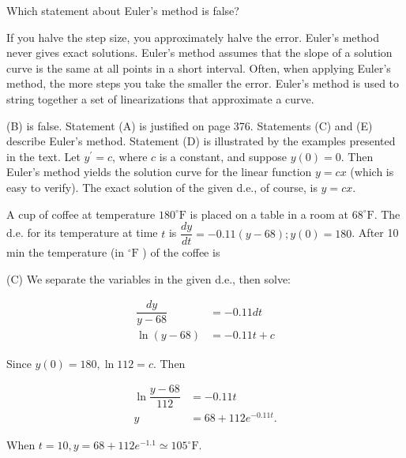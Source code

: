 \question
Which statement about Euler's method is false?
\begin{choices}
  \choice If you halve the step size, you approximately halve the error.
  \CorrectChoice Euler's method never gives exact solutions.
  \choice Euler's method assumes that the slope of a solution curve is the same at all points in a short interval.
  \choice Often, when applying Euler's method, the more steps you take the smaller the error.
  \choice Euler's method is used to string together a set of linearizations that approximate a curve.
\end{choices}
\begin{solution}
(B) is false. Statement (A) is justified on page 376. Statements (C) and (E) describe Euler's method. Statement (D) is illustrated by the examples presented in the text. Let $y^{\prime}=c$, where $c$ is a constant, and suppose $y(0)=0$. Then Euler's method yields the solution curve for the linear function $y=c x$ (which is easy to verify). The exact solution of the given d.e., of course, is $y=c x$.
\end{solution}




\newpage



\question\label{calc09:coffee}
A cup of coffee at temperature $180^{\circ} \mathrm{F}$ is placed on a table in a room at $68^{\circ} \mathrm{F}$. The d.e. for its temperature at time $t$ is $\dfrac{d y}{d t}=-0.11(y-68) ; y(0)=180$. After 10 min the temperature (in ${ }^{\circ} \mathrm{F}$ ) of the coffee is
\begin{choices}
\end{choices}
\begin{solution}
(C) We separate the variables in the given d.e., then solve:

\[
\begin{aligned}
\dfrac{d y}{y-68} & =-0.11 d t \\
\ln (y-68) & =-0.11 t+c
\end{aligned}
\]

Since $y(0)=180, \ln 112=c$. Then

\[
\begin{aligned}
\ln \dfrac{y-68}{112} & =-0.11 t \\
y & =68+112 e^{-0.11 t} .
\end{aligned}
\]

When $t=10, y=68+112 e^{-1.1} \simeq 105^{\circ} \mathrm{F}$.
\end{solution}

